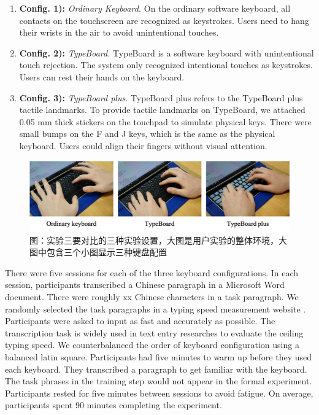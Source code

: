 \begin{enumerate}
	\item{\textbf{Config. 1):} \emph{Ordinary Keyboard.} On the ordinary software keyboard, all contacts on the touchscreen are recognized as keystrokes. Users need to hang their wrists in the air to avoid unintentional touches.}
	\item{\textbf{Config. 2):} \emph{TypeBoard.} TypeBoard is a software keyboard with unintentional touch rejection. The system only recognized intentional touches as keystrokes. Users can rest their hands on the keyboard.}
	\item{\textbf{Config. 3):} \emph{TypeBoard plus.} TypeBoard plus refers to the TypeBoard plus tactile landmarks. To provide tactile landmarks on TypeBoard, we attached 0.05 mm thick stickers on the touchpad to simulate physical keys. There were small bumps on the F and J keys, which is the same as the physical keyboard. Users could align their fingers without visual attention.}
\end{enumerate}

\begin{figure}[!tbh]
	\includegraphics[width=1.0\linewidth]{figures/study3_illu.png}
	\centering
	\caption{图：实验三要对比的三种实验设置，大图是用户实验的整体环境，大图中包含三个小图显示三种键盘配置}
	\label{fig:study3_illu}
\end{figure}

There were five sessions for each of the three keyboard configurations. In each session, participants transcribed a Chinese paragraph in a Microsoft Word document. There were roughly xx Chinese characters in a task paragraph. We randomly selected the task paragraphs in a typing speed measurement website \cite{Website-Typing}. Participants were asked to input as fast and accurately as possible. The transcription task is widely used in text entry researches \cite{2003-Metrics, 2003-Phrase, 2017-Word} to evaluate the ceiling typing speed.  We counterbalanced the order of keyboard configuration using a balanced latin square.
Participants had five minutes to warm up before they used each keyboard. They transcribed a paragraph to get familiar with the keyboard. The task phrases in the training step would not appear in the formal experiment. Participants rested for five minutes between sessions to avoid fatigue. On average, participants spent 90 minutes completing the experiment.

